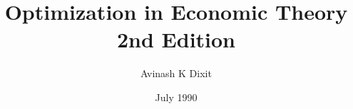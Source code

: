 \documentclass[a4paper,12pt,oneside]{book}
\begin{document}
\author{Avinash K Dixit}
\title{Optimization in Economic Theory \\  \normalsize{2nd Edition}  }   
\date{July 1990}

\frontmatter
\maketitle
\tableofcontents

\mainmatter













\backmatter
\end{document}
